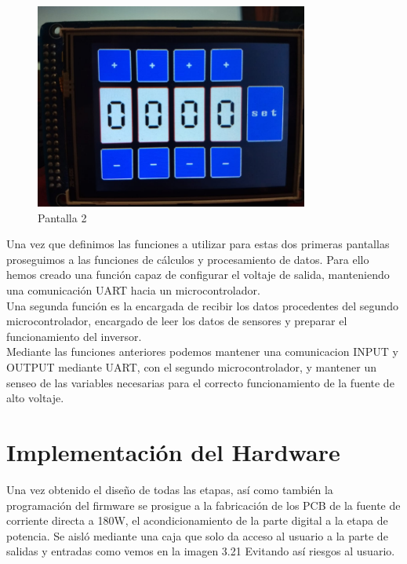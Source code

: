 \begin{figure}[H]
\centering
\includegraphics[width=9cm]{Capitulo3/figs/pantalla2.jpg}
\caption{Pantalla 2}
\end{figure}

Una vez que definimos las funciones a utilizar para estas dos primeras pantallas proseguimos a las funciones de cálculos y procesamiento de datos. Para ello hemos creado una función capaz de configurar el voltaje de salida, manteniendo una comunicación UART hacia un microcontrolador. \\

Una segunda función es la encargada de recibir los datos procedentes del segundo microcontrolador, encargado de leer los datos de sensores y preparar el funcionamiento del inversor. \\


Mediante las funciones anteriores podemos mantener una comunicacion INPUT y OUTPUT mediante UART, con el segundo microcontrolador, y mantener un senseo de las variables necesarias para el correcto funcionamiento de la fuente de alto voltaje. 

\section{Implementación del Hardware}

Una vez obtenido el diseño de todas las etapas, así como también la programación del firmware se prosigue a la fabricación de los PCB de la fuente de corriente directa a 180W, el acondicionamiento de la parte digital a la etapa de potencia. Se aisló mediante una caja que solo da acceso al usuario a la parte de salidas y entradas como vemos en la imagen 3.21 Evitando así riesgos al usuario. \\


